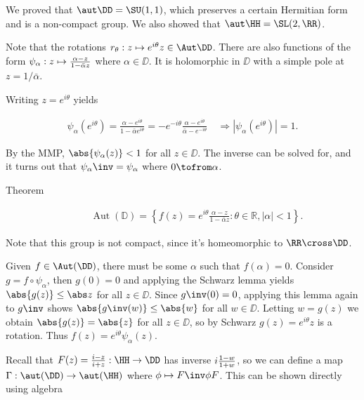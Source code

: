 We proved that \(\aut \DD = \SU(1, 1)\), which preserves a certain
Hermitian form and is a non-compact group. We also showed that
\(\aut \HH = \SL(2, \RR)\).

Note that the rotations
\(r_\theta: z \mapsto e^{i\theta} z \in \Aut \DD\). There are also
functions of the form
\(\psi_\alpha: z \mapsto {\alpha - z \over 1 - \bar \alpha z}\) where
\(\alpha \in \DD\). It is holomorphic in \(\DD\) with a simple pole at
\(z= 1/\bar \alpha\).

Writing \(z= e^{i\theta}\) yields

\begin{align*}
\psi_{\alpha}
\left(e^{i \theta}\right)=\frac{\alpha-e^{i \theta}}{1-\bar{\alpha} e^{i \theta}}=-e^{-i \theta} \frac{\alpha-e^{i \theta}}{\bar{\alpha}-e^{-i \theta}} \quad \Longrightarrow\left|\psi_{\alpha}\left(e^{i \theta}\right)\right|=1
.\end{align*}

By the MMP, \(\abs{\psi_\alpha(z)} < 1\) for all \(z\in \DD\). The
inverse can be solved for, and it turns out that
\(\psi_\alpha\inv = \psi_\alpha\) where \(0 \tofrom \alpha\).

\begin{description}
\item[Theorem]
\hfill

\begin{align*}
  \operatorname{Aut}(\mathbb{D})=\left\{f(z)=e^{i \theta} \frac{\alpha-z}{1-\bar{\alpha} z}: \theta \in \mathbb{R},|\alpha|<1\right\}
  .\end{align*}
\end{description}

Note that this group is not compact, since it's homeomorphic to
\(\RR \cross \DD\).

\begin{description}
\tightlist
\item[Proof]
Given \(f\in \Aut(\DD)\), there must be some \(\alpha\) such that
\(f(\alpha) = 0\). Consider \(g = f\circ \psi_\alpha\), then
\(g(0) = 0\) and applying the Schwarz lemma yields
\(\abs{g(z)} \leq \abs z\) for all \(z \in \DD\). Since
\(g\inv(0) = 0\), applying this lemma again to \(g\inv\) shows
\(\abs{g\inv(w)} \leq \abs{w}\) for all \(w\in \DD\). Letting
\(w = g(z)\) we obtain \(\abs{g(z)} = \abs{z}\) for all \(z\in \DD\), so
by Schwarz \(g(z) = e^{i\theta}z\) is a rotation. Thus
\(f(z) = e^{i\theta} \psi_\alpha(z)\).
\end{description}

Recall that \(F(z) = {i-z \over i+z}: \HH \to \DD\) has inverse
\(i {1 - w \over 1 + w}\), so we can define a map
\(\Gamma: \aut(\DD) \to \aut(\HH)\) where \(\phi \mapsto F\inv \phi F\).
This can be shown directly using algebra

